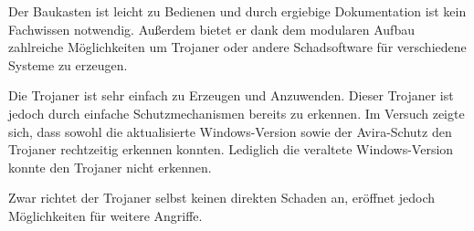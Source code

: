 Der Baukasten ist leicht zu Bedienen und durch ergiebige Dokumentation ist kein Fachwissen notwendig.
Außerdem bietet er dank dem modularen Aufbau zahlreiche Möglichkeiten um Trojaner oder andere Schadsoftware für verschiedene Systeme zu erzeugen.

Die Trojaner ist sehr einfach zu Erzeugen und Anzuwenden. 
Dieser Trojaner ist jedoch durch einfache Schutzmechanismen bereits zu erkennen.
Im Versuch zeigte sich, dass sowohl die aktualisierte Windows-Version sowie der Avira-Schutz den Trojaner rechtzeitig erkennen konnten.
Lediglich die veraltete Windows-Version konnte den Trojaner nicht erkennen. 

Zwar richtet der Trojaner selbst keinen direkten Schaden an, eröffnet jedoch Möglichkeiten für weitere Angriffe.
